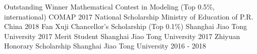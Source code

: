 
\begin{cvhonors}
	\cvaward
	{Outstanding Winner}
	{Mathematical Contest in Modeling (Top 0.5\%, international)}
	{COMAP}
	{2017}
    \cvhonor
    {National Scholarship}
    {Ministry of Education of P.R. China}
    {2018}
	\cvaward
    {Fan Xuji Chancellor's Scholarship}
    {(Top 0.1\%)}
	{Shanghai Jiao Tong University}
	{2017}
    \cvhonor
    {Merit Student}
    {Shanghai Jiao Tong University}
    {2017}
    \cvhonor
    {Zhiyuan Honorary Scholarship}
    {Shanghai Jiao Tong University}
    {2016 - 2018}
\end{cvhonors}
